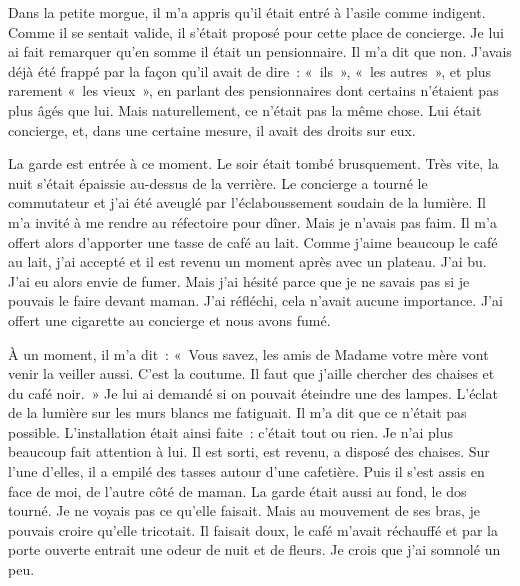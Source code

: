 \documentclass[french,twoside]{book} %
\begin{document}
Dans la petite morgue, il m’a appris qu’il était entré à l’asile comme indigent. Comme il se sentait valide, il s’était proposé pour cette place de concierge. Je lui ai fait remarquer qu’en somme il était un pensionnaire. Il m’a dit que non. J'avais déjà été frappé par la façon qu’il avait de dire : « ils », « les autres », et plus rarement « les vieux », en parlant des pensionnaires dont certains n’étaient pas plus âgés que lui. Mais naturellement, ce n’était pas la même chose. Lui était concierge, et, dans une certaine mesure, il avait des droits sur eux.\par
La garde est entrée à ce moment. Le soir était tombé brusquement. Très vite, la nuit s’était épaissie au-dessus de la verrière. Le concierge a tourné le commutateur et j’ai été aveuglé par l’éclaboussement soudain de la lumière. Il m’a invité à me rendre au réfectoire pour dîner. Mais je n’avais pas faim. Il m’a offert alors d’apporter une tasse de café au lait. Comme j’aime beaucoup le café au lait, j’ai accepté et il est revenu un moment après avec un plateau. J'ai bu. J'ai eu alors envie de fumer. Mais j’ai hésité parce que je ne savais pas si je pouvais le faire devant maman. J'ai réfléchi, cela n’avait aucune importance. J'ai offert une cigarette au concierge et nous avons fumé.\par
À un moment, il m’a dit : « Vous savez, les amis de Madame votre mère vont venir la veiller aussi. C'est la coutume. Il faut que j’aille chercher des chaises et du café noir. » Je lui ai demandé si on pouvait éteindre une des lampes. L'éclat de la lumière sur les murs blancs me fatiguait. Il m’a dit que ce n’était pas possible. L'installation était ainsi faite : c’était tout ou rien. Je n’ai plus beaucoup fait attention à lui. Il est sorti, est revenu, a disposé des chaises. Sur l’une d’elles, il a empilé des tasses autour d’une cafetière. Puis il s’est assis en face de moi, de l’autre côté de maman. La garde était aussi au fond, le dos tourné. Je ne voyais pas ce qu’elle faisait. Mais au mouvement de ses bras, je pouvais croire qu’elle tricotait. Il faisait doux, le café m’avait réchauffé et par la porte ouverte entrait une odeur de nuit et de fleurs. Je crois que j’ai somnolé un peu.\par
\end{document}
